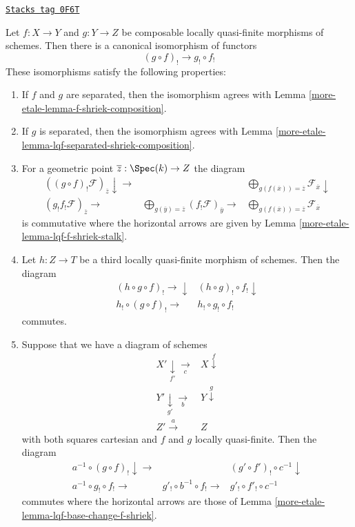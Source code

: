 \begin{lemma}
\label{more-etale-lemma-lqf-shriek-composition}
\href{https://stacks.math.columbia.edu/tag/0F6T}{\texttt{Stacks tag 0F6T}}

Let $f : X \to Y$ and $g : Y \to Z$ be composable locally quasi-finite
morphisms of schemes. Then there is a canonical isomorphism of functors
$$
(g \circ f)_! \longrightarrow g_! \circ f_!
$$
These isomorphisms satisfy the following properties:
\begin{enumerate}
\item If $f$ and $g$ are separated, then the isomorphism agrees
with Lemma \ref{more-etale-lemma-f-shriek-composition}.
\item If $g$ is separated, then the isomorphism agrees with
Lemma \ref{more-etale-lemma-lqf-separated-shriek-composition}.
\item For a geometric point $\overline{z} : \Spec(k) \to Z$ the diagram
$$
\begin{array}{ccc}((g \circ f)_!\mathcal{F})_{\overline{z}} \downarrow\longrightarrow &  & \bigoplus\nolimits_{g(f(\overline{x})) = \overline{z}}
\mathcal{F}_{\overline{x}} \downarrow \\ (g_!f_!\mathcal{F})_{\overline{z}} \longrightarrow & \bigoplus\nolimits_{g(\overline{y}) = \overline{z}}
(f_!\mathcal{F})_{\overline{y}} \longrightarrow & \bigoplus\nolimits_{g(f(\overline{x})) = \overline{z}}
\mathcal{F}_{\overline{x}}\end{array}
$$
is commutative where the horizontal arrows are given by
Lemma \ref{more-etale-lemma-lqf-f-shriek-stalk}.
\item Let $h : Z \to T$ be a third locally quasi-finite
morphism of schemes. Then the diagram
$$
\begin{array}{cc}(h \circ g \circ f)_! \longrightarrow\downarrow & (h \circ g)_! \circ f_! \downarrow \\ h_! \circ (g \circ f)_! \longrightarrow & h_! \circ g_! \circ f_!\end{array}
$$
commutes.
\item Suppose that we have a diagram of schemes
$$
\begin{array}{cc}X' \underset{f'}{\downarrow}\underset{c}{\longrightarrow} & X \overset{f}{\downarrow} \\ Y' \underset{g'}{\downarrow}\underset{b}{\longrightarrow} & Y \overset{g}{\downarrow} \\ Z' \overset{a}{\longrightarrow} & Z\end{array}
$$
with both squares cartesian and $f$ and $g$
locally quasi-finite. Then the diagram
$$
\begin{array}{ccc}a^{-1} \circ (g \circ f)_! \downarrow\longrightarrow &  & (g' \circ f')_! \circ c^{-1} \downarrow \\ a^{-1} \circ g_! \circ f_! \longrightarrow & g'_! \circ b^{-1} \circ f_! \longrightarrow & g'_! \circ f'_! \circ c^{-1}\end{array}
$$
commutes where the horizontal arrows are those of
Lemma \ref{more-etale-lemma-lqf-base-change-f-shriek}.
\end{enumerate}
\end{lemma}

